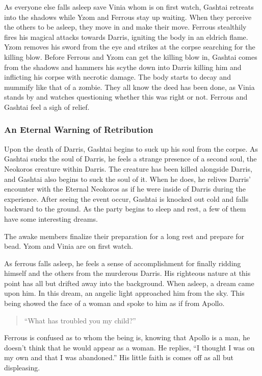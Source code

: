 As everyone else falls asleep save Vinia whom is on first watch, Gashtai retreats into the shadows while Yzom and Ferrous stay up waiting. When they perceive the others to be asleep, they move in and make their move. Ferrous stealthily fires his magical attacks towards Darris, igniting the body in an eldrich flame. Yzom removes his sword from the eye and strikes at the corpse searching for the killing blow. Before Ferrous and Yzom can get the killing blow in, Gashtai comes from the shadows and hammers his scythe down into Darris killing him and inflicting his corpse with necrotic damage. The body starts to decay and mummify like that of a zombie. They all know the deed has been done, as Vinia stands by and watches questioning whether this was right or not. Ferrous and Gashtai feel a sigh of relief.

\subsubsection{An Eternal Warning of Retribution}

Upon the death of Darris, Gashtai begins to suck up his soul from the corpse. As Gashtai sucks the soul of Darris, he feels a strange presence of a second soul, the Neokoros creature within Darris. The creature has been killed alongside Darris, and Gashtai also begins to suck the soul of it. When he does, he relives Darris' encounter with the Eternal Neokoros as if he were inside of Darris during the experience. After seeing the event occur, Gashtai is knocked out cold and falls backward to the ground. As the party begins to sleep and rest, a few of them have some interesting dreams.

The awake members finalize their preparation for a long rest and prepare for bead. Yzom and Vinia are on first watch.

As ferrous falls asleep, he feels a sense of accomplishment for finally ridding himself and the others from the murderous Darris. His righteous nature at this point has all but drifted away into the background. When asleep, a dream came upon him. In this dream, an angelic light approached him from the sky. This being showed the face of a woman and spoke to him as if from Apollo. 

\begin{quote}
	``What has troubled you my child?''
\end{quote}

Ferrous is confused as to whom the being is, knowing that Apollo is a man, he doesn't think that he would appear as a woman. He replies, ``I thought I was on my own and that I was abandoned.'' His little faith is comes off as all but displeasing.

